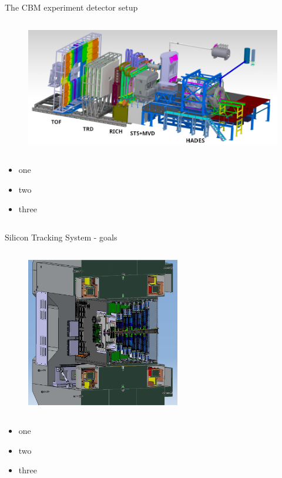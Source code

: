 \begin{columnframe}{The CBM experiment detector setup}
    \begin{column}{0.5\textwidth}
        \begin{figure}
            \centering
            \includegraphics[width=\textwidth, frame]{images/CBM_HADES_new_setup.png}
        \end{figure}
    \end{column}
    \begin{column}{0.5\textwidth}
        \begin{itemize}
            \item one
            \item two
            \item three
        \end{itemize}
    \end{column}
\end{columnframe}

\begin{columnframe}{Silicon Tracking System - goals}
    \begin{column}{0.5\textwidth}
        \begin{figure}
            \centering
            \includegraphics[width=0.6\textwidth, frame]{images/sts_render.png}
        \end{figure}
    \end{column}
    \begin{column}{0.5\textwidth}
        \begin{itemize}
            \item one
            \item two
            \item three
        \end{itemize}
    \end{column}
\end{columnframe}

